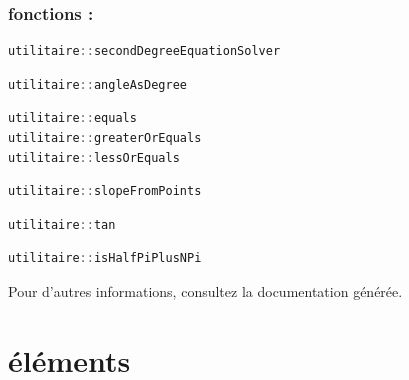 \documentclass[a4paper,11pt]{report}
\begin{document}
\subsubsection{fonctions :}
\begin{lstlisting}[title=Resolution d'équation du second degre,frame=single,language=C++]
utilitaire::secondDegreeEquationSolver
\end{lstlisting}
\begin{lstlisting}[title=Transforme un angle exprime en radian en un angle
exprime en degres,frame=single,language=C++]
utilitaire::angleAsDegree
\end{lstlisting}
\begin{lstlisting}[title=Permet de tester l egalite ou l inegalite entre deux 
nombre reels a un Epsilon d erreur,frame=single,language=C++]
utilitaire::equals
utilitaire::greaterOrEquals
utilitaire::lessOrEquals
\end{lstlisting}
\begin{lstlisting}[title=Permet de trouver le coefficiant angulaire a partir de deux points,frame=single,language=C++]
utilitaire::slopeFromPoints
\end{lstlisting}
\begin{lstlisting}[title=Permet de trouver la valeur tangante d'un angle 
	en radian mais aussi de retourner une valeur particuliere pour la tangante de
$\pi/2$,frame=single,language=C++]
utilitaire::tan
\end{lstlisting}
\begin{lstlisting}[title=Permet de savoir si $\alpha$ vaut  $\frac{\pi}{2} + n *
\pi\ n \in \mathbb{N}$,frame=single,language=C++]
utilitaire::isHalfPiPlusNPi
\end{lstlisting}

Pour d'autres informations, consultez la documentation générée.
\section[Les éléments]{éléments}
\end{document}
